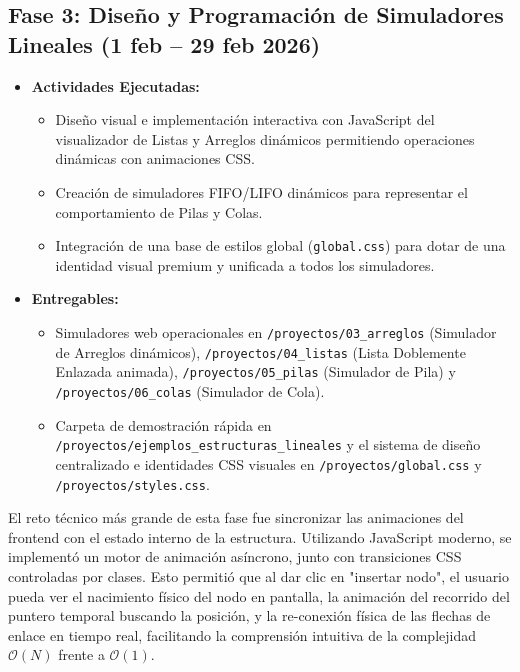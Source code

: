 \documentclass[12 pt]{article}
\begin{document}
\subsection*{Fase 3: Diseño y Programación de Simuladores Lineales (1 feb – 29 feb 2026)}
\begin{itemize}
    \item \textbf{Actividades Ejecutadas:}
    \begin{itemize}
        \item Diseño visual e implementación interactiva con JavaScript del visualizador de Listas y Arreglos dinámicos permitiendo operaciones dinámicas con animaciones CSS.
        \item Creación de simuladores FIFO/LIFO dinámicos para representar el comportamiento de Pilas y Colas.
        \item Integración de una base de estilos global (\texttt{global.css}) para dotar de una identidad visual premium y unificada a todos los simuladores.
    \end{itemize}
    \item \textbf{Entregables:}
    \begin{itemize}
        \item Simuladores web operacionales en \texttt{/proyectos/03\_arreglos} (Simulador de Arreglos dinámicos), \texttt{/proyectos/04\_listas} (Lista Doblemente Enlazada animada), \texttt{/proyectos/05\_pilas} (Simulador de Pila) y \texttt{/proyectos/06\_colas} (Simulador de Cola).
        \item Carpeta de demostración rápida en \texttt{/proyectos/ejemplos\_estructuras\_lineales} y el sistema de diseño centralizado e identidades CSS visuales en \texttt{/proyectos/global.css} y \texttt{/proyectos/styles.css}.
    \end{itemize}
\end{itemize}

El reto técnico más grande de esta fase fue sincronizar las animaciones del frontend con el estado interno de la estructura. Utilizando JavaScript moderno, se implementó un motor de animación asíncrono, junto con transiciones CSS controladas por clases. Esto permitió que al dar clic en "insertar nodo", el usuario pueda ver el nacimiento físico del nodo en pantalla, la animación del recorrido del puntero temporal buscando la posición, y la re-conexión física de las flechas de enlace en tiempo real, facilitando la comprensión intuitiva de la complejidad $\mathcal{O}(N)$ frente a $\mathcal{O}(1)$.
\end{document}
